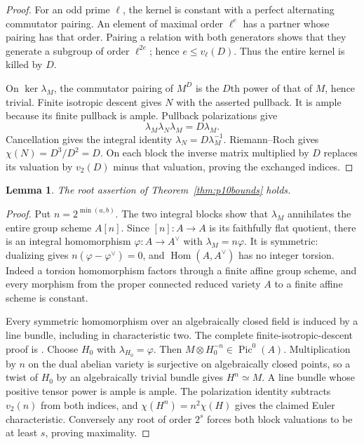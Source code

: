 \documentclass[11pt]{article}
\newtheorem{lemma}[theorem]{Lemma}
\theoremstyle{definition}\newtheorem{definition}[theorem]{Definition}
\theoremstyle{remark}\newtheorem{remark}[theorem]{Remark}
\newcommand{\Pic}{\operatorname{Pic}}
\newcommand{\Hom}{\operatorname{Hom}}
\begin{document}
\begin{proof}
For an odd prime $\ell$, the kernel is constant with a perfect alternating commutator pairing. An element of maximal order $\ell^e$ has a partner whose pairing has that order. Pairing a relation with both generators shows that they generate a subgroup of order $\ell^{2e}$; hence $e\le v_\ell(D)$. Thus the entire kernel is killed by $D$.

On $\ker\lambda_M$, the commutator pairing of $M^D$ is the $D$th power of that of $M$, hence trivial. Finite isotropic descent \citep[Corollary~8.11 and its proof, p.~117]{EGM} gives $N$ with the asserted pullback. It is ample because its finite pullback is ample. Pullback polarizations give
\[
 \lambda_M\lambda_N\lambda_M=D\lambda_M.
\]
Cancellation gives the integral identity $\lambda_N=D\lambda_M^{-1}$. Riemann--Roch gives $\chi(N)=D^3/D^2=D$. On each block the inverse matrix multiplied by $D$ replaces its valuation by $v_2(D)$ minus that valuation, proving the exchanged indices.
\end{proof}

\begin{lemma}\label{lem:p10root}
The root assertion of Theorem~\ref{thm:p10bounds} holds.
\end{lemma}
\begin{proof}
Put $n=2^{\min(a,b)}$. The two integral blocks show that $\lambda_M$ annihilates the entire group scheme $A[n]$. Since $[n]:A\to A$ is its faithfully flat quotient, there is an integral homomorphism $\varphi:A\to A^\vee$ with $\lambda_M=n\varphi$. It is symmetric: dualizing gives $n(\varphi-\varphi^\vee)=0$, and $\Hom(A,A^\vee)$ has no integer torsion. Indeed a torsion homomorphism factors through a finite affine group scheme, and every morphism from the proper connected reduced variety $A$ to a finite affine scheme is constant.

Every symmetric homomorphism over an algebraically closed field is induced by a line bundle, including in characteristic two. The complete finite-isotropic-descent proof is \citet[Proposition~11.2 and Corollary~11.3, pp.~159--160]{EGM}. Choose $H_0$ with $\lambda_{H_0}=\varphi$. Then $M\otimes H_0^{-n}\in\Pic^0(A)$. Multiplication by $n$ on the dual abelian variety is surjective on algebraically closed points, so a twist of $H_0$ by an algebraically trivial bundle gives $H^n\simeq M$. A line bundle whose positive tensor power is ample is ample. The polarization identity subtracts $v_2(n)$ from both indices, and $\chi(H^n)=n^2\chi(H)$ gives the claimed Euler characteristic. Conversely any root of order $2^s$ forces both block valuations to be at least $s$, proving maximality.
\end{proof}
\end{document}
